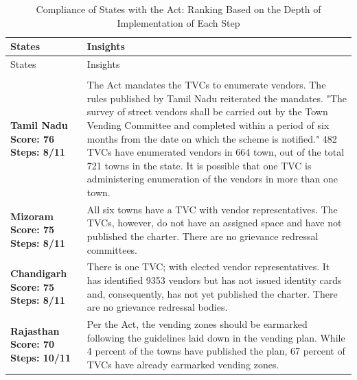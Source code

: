 \documentclass[a4paper, 12pt, twoside]{article}
\begin{document}
{%
\footnotesize
\begin{longtable}[l]{>{\raggedright}p{4cm}>{\raggedright\arraybackslash}p{10cm}}
\caption{Compliance of States with the Act: Ranking Based on the Depth of Implementation of Each Step}
\label{tab: Ranking}\\
	\toprule
	States & Insights \\
	\midrule
	\endfirsthead
	\toprule
	States & Insights \\
	\midrule
	\endhead
	\bottomrule
	\endfoot
	\endlastfoot
	\multicolumn{2}{c}{States with Best Compliance (Index Score Above 70)}\\
	\midrule
\cellcolor{SVACgreen1}\bf{Tamil Nadu}
\newline
Score: 76
\newline
Steps: 8/11
&
\cellcolor{SVACgreen2}The Act mandates the TVCs to enumerate vendors. The rules published by Tamil Nadu reiterated the mandates. "The survey of street vendors shall be carried out by the Town Vending Committee and completed within a period of six months from the date on which the scheme is notified."  482 TVCs have enumerated vendors in 664 town, out of the total 721 towns in the state.  It is possible that one TVC is administering enumeration of the vendors in more than one town.
\\
\cellcolor{SVACgreen1}\bf{Mizoram}
\newline
\bf{Score: 75}
\newline
\bf{Steps: 8/11}
&
\cellcolor{SVACgreen2}All six towns have a TVC with vendor representatives. The TVCs, however, do not have an assigned space and have not published the charter. There are no grievance redressal committees.
\\
\cellcolor{SVACgreen1}\bf{Chandigarh}
\newline
\bf{Score: 75}
\newline
\bf{Steps: 8/11}
&
\cellcolor{SVACgreen2}There is one TVC; with elected vendor representatives. It has identified 9353 vendors but has not issued identity cards and, consequently, has not yet published the charter. There are no grievance redressal bodies.
\\
\cellcolor{SVACgreen1}\bf{Rajasthan}
\newline
\bf{Score: 70}
\newline
\bf{Steps: 10/11}
&
\cellcolor{SVACgreen2}Per the Act, the vending zones should be earmarked following the guidelines laid down in the vending plan. While 4 percent of the towns have published the plan, 67 percent of TVCs have already earmarked vending zones.

\end{longtable}}
\end{document}
